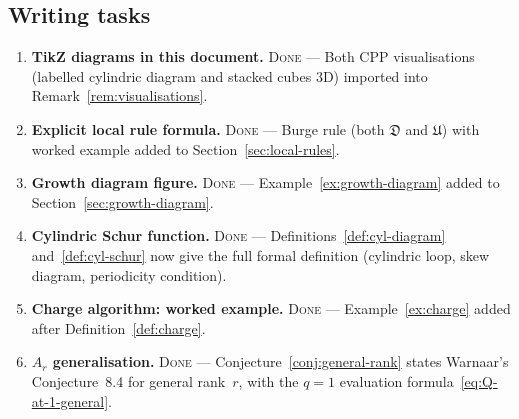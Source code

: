 \documentclass[11pt]{article}
\theoremstyle{plain}
\theoremstyle{definition}
\theoremstyle{remark}
\begin{document}
\subsection*{Writing tasks}
\begin{enumerate}
\item \textbf{TikZ diagrams in this document.}
  \textsc{Done} --- Both CPP visualisations (labelled cylindric
  diagram and stacked cubes 3D) imported into
  Remark~\ref{rem:visualisations}.

\item \textbf{Explicit local rule formula.}
  \textsc{Done} --- Burge rule (both $\mathfrak{D}$ and
  $\mathfrak{U}$) with worked example added to
  Section~\ref{sec:local-rules}.

\item \textbf{Growth diagram figure.}
  \textsc{Done} --- Example~\ref{ex:growth-diagram} added
  to Section~\ref{sec:growth-diagram}.

\item \textbf{Cylindric Schur function.}
  \textsc{Done} --- Definitions~\ref{def:cyl-diagram}
  and~\ref{def:cyl-schur} now give the full formal definition
  (cylindric loop, skew diagram, periodicity condition).

\item \textbf{Charge algorithm: worked example.}
  \textsc{Done} --- Example~\ref{ex:charge} added after
  Definition~\ref{def:charge}.

\item \textbf{$A_r$ generalisation.}
  \textsc{Done} --- Conjecture~\ref{conj:general-rank} states
  Warnaar's Conjecture~8.4 for general rank~$r$, with the
  $q = 1$ evaluation formula~\eqref{eq:Q-at-1-general}.
\end{enumerate}
\end{document}
